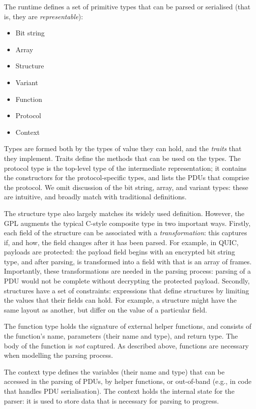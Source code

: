 \documentclass[10pt,sigconf]{acmart}
\begin{document}
The runtime defines a set of primitive types that can be parsed or serialised (that is,
they are \emph{representable}):
\begin{itemize}
	\item Bit string
	\item Array
	\item Structure 
	\item Variant
	\item Function
	\item Protocol
	\item Context
\end{itemize}

Types are formed both by the types of value they can hold, and the \emph{traits} that they
implement. Traits define the methods that can be used on the types. The protocol type is
the top-level type of the intermediate representation; it contains the constructors for
the protocol-specific types, and lists the PDUs that comprise the protocol. We omit
discussion of the bit string, array, and variant types: these are intuitive, and broadly
match with traditional definitions.

The structure type also largely matches its widely used definition. However, the GPL
augments the typical C-style composite type in two important ways. Firstly, each field of
the structure can be associated with a \emph{transformation}: this captures if, and how,
the field changes after it has been parsed. For example, in QUIC, payloads are protected:
the payload field begins with an encrypted bit string type, and after parsing, is
transformed into a field with that is an array of frames. Importantly, these
transformations are needed in the parsing process: parsing of a PDU would not be complete
without decrypting the protected payload. Secondly, structures have a set of constraints:
expressions that define structures by limiting the values that their fields can hold. For
example, a structure might have the same layout as another, but differ on the value of a
particular field.

The function type holds the signature of external helper functions, and consists of the
function's name, parameters (their name and type), and return type. The body of the
function is \emph{not} captured. As described above, functions are necessary when
modelling the parsing process.

The context type defines the variables (their name and type) that can be accessed in the
parsing of PDUs, by helper functions, or out-of-band (e.g., in code that handles PDU
serialisation). The context holds the internal state for the parser: it is used to store
data that is necessary for parsing to progress.
\end{document}
